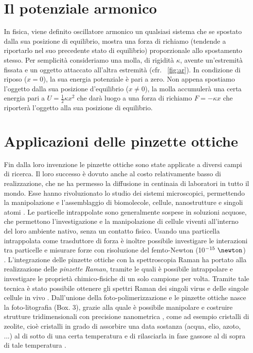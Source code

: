 \section*{Il potenziale armonico}
In fisica, viene definito oscillatore armonico un qualsiasi sistema che se spostato dalla sua posizione di equilibrio, mostra una forza di richiamo (tendende a riportarlo nel suo precedente stato di equilibrio) proporzionale allo spostamento stesso.
Per semplicità consideriamo una molla, di rigidità $\kappa$, avente un'estremità fissata e un oggetto attaccato all'altra estremità (cfr. \figurename~\ref{fig:ar}). In condizione di riposo ($x=0$), la sua energia potenziale è pari a zero. Non appena spostiamo l'oggetto dalla sua posizione d'equilibrio ($x\neq 0$), la molla accumulerà una certa energia pari a $U=\frac{1}{2}\kappa x^2 $ che darà luogo a una forza di richiamo $F=-\kappa x$  che  riporterà l'oggetto alla sua posizione di equilibrio.

\section*{Applicazioni delle pinzette ottiche}
Fin dalla loro invenzione le pinzette ottiche sono state applicate a diversi campi di ricerca. Il loro successo è dovuto anche al costo relativamente basso di realizzazione, che ne ha permesso la diffusione in centinaia di laboratori in tutto il mondo. Esse hanno rivoluzionato lo studio dei sistemi microscopici, permettendo la manipolazione e l'assemblaggio di biomolecole, cellule, nanostrutture e singoli atomi \cite{marago2013optical}.
Le particelle intrappolate sono generalmente sospese in soluzioni acquose, che permettono l'investigazione e la manipolazione di cellule viventi all'interno del loro ambiente nativo, senza un contatto fisico.
Usando una particella intrappolata come trasduttore di forza è inoltre possibile investigare le interazioni tra particelle e misurare forze con risoluzione del femto-Newton (10$^{-15}~\newton$) \cite{marago2010photonic,rohrbach2005switching}.
L'integrazione delle pinzette ottiche con la spettroscopia Raman ha portato alla realizzazione delle \emph{pinzette Raman}, tramite le quali è possibile intrappolare e investigare le proprietà chimico-fisiche di un solo campione per volta. Tramite tale tecnica è stato possibile ottenere gli spettri Raman dei singoli virus e delle singole cellule in vivo \cite{xie2002near}.
Dall'unione della foto-polimerizzazione e le pinzette ottiche nasce la foto-litografia (Box. 3), grazie alla quale è possibile manipolare e costruire strutture tridimensionali con precisione nanometrica \cite{guffey2010all}, come ad esempio cristalli di zeolite, cioè cristalli in grado di assorbire una data sostanza (acqua, elio, azoto, ...) al di sotto di una certa temperatura e di rilasciarla in fase gassose al di sopra di tale temperatura \cite{woerdemann2010dynamic}.


